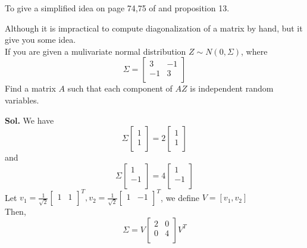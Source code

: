 To give a simplified idea on page 74,75 of \cite*{Und_Chatterjee} and proposition 13. 
\begin{eg}[diagonalization]
    Although it is impractical to compute diagonalization of a matrix by hand, but it give you some idea. 
    \\If you are given a mulivariate normal distribution \(Z \sim N(0, \Sigma )\), where 
    \[
        \Sigma  = \begin{bmatrix}
            3 &  -1 \\
            -1 &  3 \\
        \end{bmatrix}
    \]
    Find a matrix \(A\) such that each component of \(AZ\) is independent random variables.   
\end{eg}
\textbf{Sol.}
We have 
    \[
        \Sigma \begin{bmatrix}
             1 \\
             1 \\
        \end{bmatrix} = 2 \begin{bmatrix}
             1 \\
             1 \\
        \end{bmatrix}
    \]
    and 
    \[
        \Sigma \begin{bmatrix}
             1 \\
             -1 \\
        \end{bmatrix} = 4 \begin{bmatrix}
             1 \\
             -1 \\
        \end{bmatrix}
    \]
    Let \(v_1 = \frac{1}{\sqrt{2} }\begin{bmatrix}
        1 &  1 \\
    \end{bmatrix}^T, v_2 = \frac{1}{\sqrt{2} } \begin{bmatrix}
        1 &  -1 \\
    \end{bmatrix}^{T} \), we define \(V = [v_1, v_2]\)
    \\
    Then,
    \[
        \Sigma = V \begin{bmatrix}
            2 &  0 \\
            0 &  4 \\
        \end{bmatrix} V^T 
    \] 
